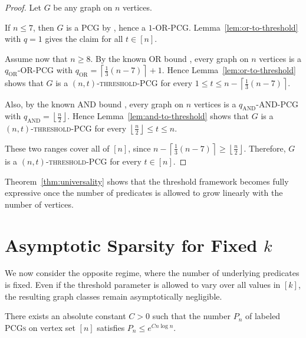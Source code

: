 \documentclass[a4paper,UKenglish,cleveref,autoref,thm-restate]{socg-lipics-v2021}
\begin{document}
\begin{proof}
Let $G$ be any graph on $n$ vertices.

If $n\le 7$, then $G$ is a \textsc{PCG} by \cite{Calamoneri2012AllGWN}, hence a \textsc{$1$-\textsc{OR}-\textsc{PCG}}. Lemma~\ref{lem:or-to-threshold} with $q=1$ gives the claim for all $t\in[n]$.

Assume now that $n\ge 8$. By the known \textsc{OR} bound \cite{Calamoneri2021OnGOI}, every graph on $n$ vertices is a \textsc{$q_{\mathrm{OR}}$-\textsc{OR}-\textsc{PCG}} with
\(
q_{\mathrm{OR}}=\left\lceil \frac{1}{3}(n-7)\right\rceil+1.
\)
Hence Lemma~\ref{lem:or-to-threshold} shows that $G$ is a \textsc{$(n,t)$-threshold-\textsc{PCG}} for every
\(
1 \le t \le n-\left\lceil \frac{1}{3}(n-7)\right\rceil.
\)

Also, by the known \textsc{AND} bound \cite{Calamoneri2021OnGOI}, every graph on $n$ vertices is a \textsc{$q_{\mathrm{AND}}$-\textsc{AND}-\textsc{PCG}} with
\(
q_{\mathrm{AND}}=\left\lfloor \frac{n}{2}\right\rfloor.
\)
Hence Lemma~\ref{lem:and-to-threshold} shows that $G$ is a \textsc{$(n,t)$-threshold-\textsc{PCG}} for every
\(
\left\lfloor \frac{n}{2}\right\rfloor \le t \le n.
\)

These two ranges cover all of $[n]$, since
\(
n-\left\lceil \frac{1}{3}(n-7)\right\rceil \ge \left\lfloor \frac{n}{2}\right\rfloor.
\)
Therefore, $G$ is a \textsc{$(n,t)$-threshold-\textsc{PCG}} for every $t\in[n]$.
\end{proof}

Theorem~\ref{thm:universality} shows that the threshold framework becomes fully expressive once the number of predicates is allowed to grow linearly with the number of vertices.

\section{Asymptotic Sparsity for Fixed $k$}\label{sec:counting}

We now consider the opposite regime, where the number of underlying predicates is fixed. Even if the threshold parameter is allowed to vary over all values in $[k]$, the resulting graph classes remain asymptotically negligible.

\begin{lemma}\label{lem:pcg-count}
There exists an absolute constant $C>0$ such that the number $P_n$ of labeled
\textsc{PCGs} on vertex set $[n]$ satisfies $P_n \le e^{C n\log n}$.
\end{lemma}
\end{document}
